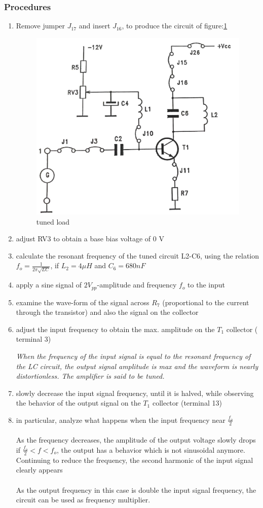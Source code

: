 \documentclass[12pt,a4paper]{article}
\begin{document}
    \subsubsection{Procedures}
    \begin{enumerate}
        \item Remove jumper $J_{17}$ and insert $J_{16}$, to produce the circuit of figure:\ref{fig:B32.3}
        \begin{figure}[H]
            \centering
            \includegraphics[width=0.5\linewidth]{analogue3_3.jpeg}
            \caption{tuned load}
            \label{fig:B32.3}
        \end{figure}
        \item adjust RV3 to obtain a base bias voltage of 0 V
        \item calculate the resonant frequency of the tuned circuit L2-C6, using the relation $f_o = \frac{1}{2\pi \sqrt{LC}}$, if $L_2 = 4\mu H$ and $C_6 = 680nF$
        \item apply a sine signal of $2V_{pp}$-amplitude and frequency $f_o$ to the input
        \item examine the wave-form of the signal across $R_7$ (proportional to the current through the transistor) and also the signal on the collector
        \item adjust the input frequency to obtain the max. amplitude on the $T_1$ collector ( terminal 3)
        
    \textit{When the frequency of the input signal is equal to the resonant
    frequency of the LC circuit, the output signal amplitude is max and the waveform is nearly distortionless. The amplifier is said to be tuned.}
        \item slowly decrease the input signal frequency, until it is halved, while observing the behavior of the output signal on the $T_1$ collector (terminal 13)
        \item in particular, analyze what happens when the input frequency near $\frac{f_o}{2}$
    \\
    \\
    As the frequency decreases, the amplitude of the output voltage slowly drops if $\frac{f_o}{2}<f<f_o$, the output has a behavior which is not sinusoidal anymore. Continuing to reduce the frequency, the second harmonic of the input signal clearly appears
    \\
    \\
    As the output frequency in this case is double the input signal
    frequency, the circuit can be used as frequency multiplier.
    \end{enumerate}
\end{document}
